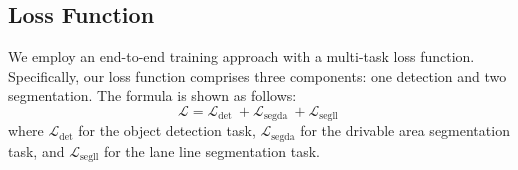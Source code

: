 \documentclass[lettersize,journal]{IEEEtran}
\begin{document}
\subsection{Loss Function}
\label{subsec: Loss Function}
We employ an end-to-end training approach with a multi-task loss function. Specifically, our loss function comprises three components: one detection and two segmentation. The formula is shown as follows:
\begin{equation}
\mathcal{L}=\mathcal{L}_{\text {det }}+\mathcal{L}_{\text {segda }}+\mathcal{L}_{\text {segll }}
\end{equation}
where $\mathcal{L}_{\text {det}}$ for the object detection task, $\mathcal{L}_{\text {segda}}$ for the drivable area segmentation task, and $\mathcal{L}_{\text {segll}}$ for the lane line segmentation task. 
\end{document}
